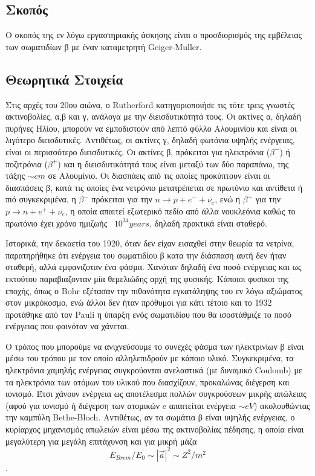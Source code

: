 \documentclass[a4paper]{article}
\begin{document}
\subsection*{Σκοπός}
	Ο σκοπός της εν λόγω εργαστηριακής άσκησης είναι ο προσδιορισμός της εμβέλειας των σωματιδίων β με έναν καταμετρητή Geiger-Muller.
\subsection*{Θεωρητικά Στοιχεία}

Στις αρχές του 20ου αιώνα, ο Rutherford κατηγοριοποιήσε τις τότε τρεις γνωστές ακτινοβολίες, α,β και γ, ανάλογα με την διεισδυτικότητά τους. Οι ακτίνες α, δηλαδή πυρήνες Ηλίου, μπορούν να εμποδιστούν από λεπτό φύλλο Αλουμινίου και είναι οι λιγότερο διεισδυτικές. Αντιθέτως, οι ακτίνες γ, δηλαδή φωτόνια υψηλής ενέργειας, είναι οι περισσότερο διεισδυτικές. 
	Οι ακτίνες β, πρόκειται για ηλεκτρόνια ($\beta^-$) ή ποζιτρόνια ($\beta^+$) και η διεισδυτικότητά τους είναι μεταξύ των δύο παραπάνω, της τάξης $\sim cm$ σε Αλουμίνιο. Οι διασπάεις από τις οποίες προκύπτουν είναι οι διασπάσεις β, κατά τις οποίες ένα νετρόνιο μετατρέπεται σε πρωτόνιο και αντίθετα ή πιό συγκεκριμένα, η $\beta^-$ πρόκειται για την $n \rightarrow p + e^- + \overline{\nu_e}$, ενώ η $\beta^+$ για την $p \rightarrow n + e^+ +\nu_e$, η οποία απαιτεί εξωτερικό πεδίο από άλλα νουκλεόνια καθώς το πρωτόνιο έχει χρόνο ημιζωής ~$10^{34}years$, δηλαδή πρακτικά είναι σταθερό.
	
	Ιστορικά, την δεκαετία του 1920, όταν δεν είχαν εισαχθεί στην θεωρία τα νετρίνα, παρατηρήθηκε ότι ενέργεια του σωματιδίου β κατα την διάσπαση αυτή δεν ήταν σταθερή, αλλά εμφανιζοταν ένα φάσμα. Χανόταν δηλαδή ένα ποσό ενέργειας και ως εκτούτου παραβιαζονταν μία θεμελιώδης αρχή της φυσικής. Κάποιοι φυσικοι της εποχής, όπως ο Bohr εξέτασαν την πιθανότητα εγκατάληψης του εν λόγω αξιώματος στον μικρόκοσμο, ενώ άλλοι δεν ήταν πρόθυμοι για κάτι τέτοιο και το 1932 προτάθηκε από τον Pauli η ύπαρξη ενός σωματιδίου που θα ισοστάθμιζε το ποσό ενέργειας που φαινόταν να χάνεται.
	
	
	Ο τρόπος που μπορούμε να ανιχνεύσουμε το συνεχές φάσμα των ηλεκτρινίων β είναι μέσω του τρόπου με τον οποίο αλληλεπιδρούν με κάποιο υλικό. Συγκεκριμένα, τα ηλεκτρόνια χαμηλής ενέργειας συγκρούονται ανελαστικά (με δυναμικό Coulomb) με τα ηλεκτρόνια των ατόμων του υλικού που διασχίζουν, προκαλώνας διέγερση και ιονισμό. Έτσι χάνουν ενέργεια ως αποτέλεσμα πολλών συγκρούσεων μικρής απώλειας (αφού για ιονισμό ή διέγερση των ατομικών e απαιτείται ενέργεια $\sim eV$) ακολουθώντας την καμπύλη Bethe-Bloch. Αντιθέτως, αν τα σωμάτια β είναι υψηλής ενέργειας, ο κυρίαρχος μηχανισμός απωλειών είναι μέσω της ακτινοβολίας πέδησης, η οποία είναι μεγαλύτερη για μεγάλη επιτάχυνση και για μικρή μάζα $$E_{Brem}/E_0 \sim |\vec{a}|^2 \sim Z^2/m^2$$. 
	
\end{document}
